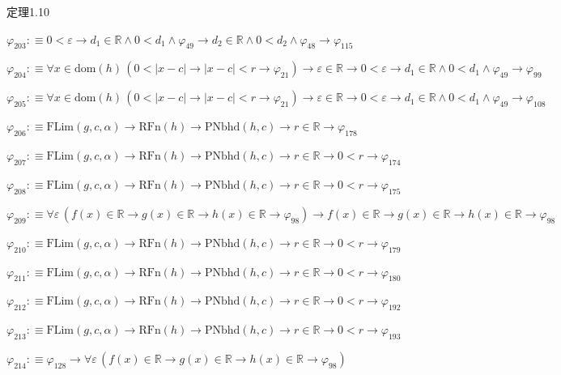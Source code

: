 \begin{fullproof}{定理1.10}
\begin{abbrevlist}
\item $\varphi_{203} :\equiv 0 < \varepsilon \to d_{1} \in \mathbb{R} \land 0 < d_{1} \land \varphi_{49} \to d_{2} \in \mathbb{R} \land 0 < d_{2} \land \varphi_{48} \to \varphi_{115}$
\item $\varphi_{204} :\equiv \forall x \in \mathrm{dom}(h)\,(0 < \lvert x - c \rvert \to \lvert x - c \rvert < r \to \varphi_{21}) \to \varepsilon \in \mathbb{R} \to 0 < \varepsilon \to d_{1} \in \mathbb{R} \land 0 < d_{1} \land \varphi_{49} \to \varphi_{99}$
\item $\varphi_{205} :\equiv \forall x \in \mathrm{dom}(h)\,(0 < \lvert x - c \rvert \to \lvert x - c \rvert < r \to \varphi_{21}) \to \varepsilon \in \mathbb{R} \to 0 < \varepsilon \to d_{1} \in \mathbb{R} \land 0 < d_{1} \land \varphi_{49} \to \varphi_{108}$
\item $\varphi_{206} :\equiv \mathrm{FLim}(g,c,\alpha) \to \mathrm{RFn}(h) \to \mathrm{PNbhd}(h,c) \to r \in \mathbb{R} \to \varphi_{178}$
\item $\varphi_{207} :\equiv \mathrm{FLim}(g,c,\alpha) \to \mathrm{RFn}(h) \to \mathrm{PNbhd}(h,c) \to r \in \mathbb{R} \to 0 < r \to \varphi_{174}$
\item $\varphi_{208} :\equiv \mathrm{FLim}(g,c,\alpha) \to \mathrm{RFn}(h) \to \mathrm{PNbhd}(h,c) \to r \in \mathbb{R} \to 0 < r \to \varphi_{175}$
\item $\varphi_{209} :\equiv \forall \varepsilon\,(f(x) \in \mathbb{R} \to g(x) \in \mathbb{R} \to h(x) \in \mathbb{R} \to \varphi_{98}) \to f(x) \in \mathbb{R} \to g(x) \in \mathbb{R} \to h(x) \in \mathbb{R} \to \varphi_{98}$
\item $\varphi_{210} :\equiv \mathrm{FLim}(g,c,\alpha) \to \mathrm{RFn}(h) \to \mathrm{PNbhd}(h,c) \to r \in \mathbb{R} \to 0 < r \to \varphi_{179}$
\item $\varphi_{211} :\equiv \mathrm{FLim}(g,c,\alpha) \to \mathrm{RFn}(h) \to \mathrm{PNbhd}(h,c) \to r \in \mathbb{R} \to 0 < r \to \varphi_{180}$
\item $\varphi_{212} :\equiv \mathrm{FLim}(g,c,\alpha) \to \mathrm{RFn}(h) \to \mathrm{PNbhd}(h,c) \to r \in \mathbb{R} \to 0 < r \to \varphi_{192}$
\item $\varphi_{213} :\equiv \mathrm{FLim}(g,c,\alpha) \to \mathrm{RFn}(h) \to \mathrm{PNbhd}(h,c) \to r \in \mathbb{R} \to 0 < r \to \varphi_{193}$
\item $\varphi_{214} :\equiv \varphi_{128} \to \forall \varepsilon\,(f(x) \in \mathbb{R} \to g(x) \in \mathbb{R} \to h(x) \in \mathbb{R} \to \varphi_{98})$

\end{abbrevlist}
\end{fullproof}
